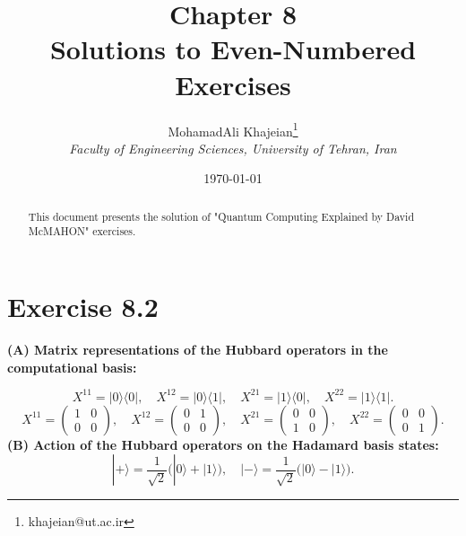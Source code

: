 \documentclass{article}
\title{\textbf{Chapter 8} \\ \small Solutions to Even-Numbered Exercises}
\author{
    MohamadAli Khajeian\footnote{khajeian@ut.ac.ir} \\ 
    \small \textit{Faculty of Engineering Sciences, University of Tehran, Iran} \\ 
}
\date{\today}
\begin{document}
\maketitle

\begin{abstract}
    This document presents the solution of "Quantum Computing Explained by David McMAHON" exercises.
\end{abstract}

\section*{Exercise 8.2}

\textbf{(A) Matrix representations of the Hubbard operators in the computational basis:}

\[
X^{11} = |0\rangle\langle 0|, \quad
X^{12} = |0\rangle\langle 1|, \quad
X^{21} = |1\rangle\langle 0|, \quad
X^{22} = |1\rangle\langle 1|.
\]
\[
X^{11} = \begin{pmatrix} 1 & 0 \\ 0 & 0 \end{pmatrix}, \quad
X^{12} = \begin{pmatrix} 0 & 1 \\ 0 & 0 \end{pmatrix}, \quad
X^{21} = \begin{pmatrix} 0 & 0 \\ 1 & 0 \end{pmatrix}, \quad
X^{22} = \begin{pmatrix} 0 & 0 \\ 0 & 1 \end{pmatrix}.
\]
\textbf{(B) Action of the Hubbard operators on the Hadamard basis states:}
\[
|+\rangle = \frac{1}{\sqrt{2}} \big(|0\rangle + |1\rangle \big), \quad
|-\rangle = \frac{1}{\sqrt{2}} \big(|0\rangle - |1\rangle \big).
\]
\end{document}
